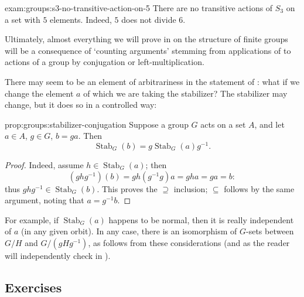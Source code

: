 \begin{exam}{}{exam:groups:s3-no-transitive-action-on-5}
  There are no transitive actions of $S_3$ on a set with $5$ elements.
  Indeed, $5$ does not divide $6$.
\end{exam}

Ultimately, almost everything we will prove in  on
the structure of finite groups will be a consequence of `counting
arguments' stemming from applications of
 to actions of a group
by conjugation or left-multiplication.

There may seem to be an element of arbitrariness in the statement of
: what if we
change the element $a$ of which we are taking the stabilizer? The
stabilizer may change, but it does so in a controlled way:

\begin{prop}{}{prop:groups:stabilizer-conjugation}
  Suppose a group $G$ acts on a set $A$, and let
$a \in A$, $g \in G$, $b = ga$. Then
\[
  \operatorname{Stab}_G(b) = g\operatorname{Stab}_G(a)g^{-1}.
\]
\end{prop}
\begin{proof}
  Indeed, assume $h \in \operatorname{Stab}_G(a)$; then
  \[
    (ghg^{-1})(b) = gh(g^{-1}g)a = gha = ga = b:
  \]
  thus $ghg^{-1} \in \operatorname{Stab}_G(b)$. This proves the
  $\supseteq$ inclusion; $\subseteq$ follows by the same argument,
  noting that $a = g^{-1}b$.
\end{proof}

For example, if $\operatorname{Stab}_G(a)$ happens to be normal, then
it is really independent of $a$ (in any given orbit). In any case,
there is an isomorphism of $G$-sets between $G/H$ and $G/(gHg^{-1})$,
as follows from these considerations (and as the reader will
independently check in
).

\subsection*{Exercises}

